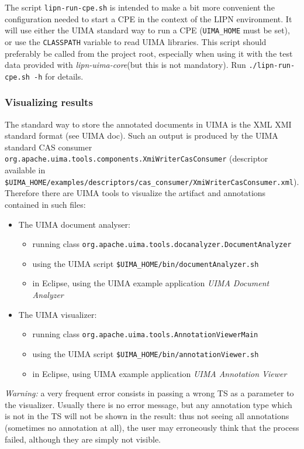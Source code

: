 \documentclass{article}
\newenvironment{xitemize}{
\begin{itemize}
  \setlength{\itemsep}{.3\baselineskip}
  \setlength{\topsep}{0pt}
  \setlength{\parskip}{0pt}
  \setlength{\parsep}{0pt}
}{\end{itemize}}
\newcommand{\uimaModule}{{\em lipn-uima-core}\xspace}
\begin{document}
The script {\tt lipn-run-cpe.sh} is intended to make a bit more convenient the configuration needed to start a CPE in the context of the LIPN environment. It will use either the UIMA standard way to run a CPE ({\tt UIMA\_HOME} must be set), or use the {\tt CLASSPATH} variable to read UIMA libraries. This script should preferably be called from the project root, especially when using it with the test data provided with \uimaModule (but this is not mandatory). Run {\tt ./lipn-run-cpe.sh -h} for details.


\subsubsection{Visualizing results}

The standard way to store the annotated documents in UIMA is the XML XMI standard format (see UIMA doc). Such an output is produced by the UIMA standard CAS consumer {\tt org.apache.uima.tools.components.XmiWriterCasConsumer} (descriptor available in {\tt \$UIMA\_HOME/examples/descriptors/cas\_consumer/XmiWriterCasConsumer.xml}). Therefore there are UIMA tools to visualize the artifact and annotations contained in such files:

\begin{xitemize}
\item The UIMA document analyser:
\begin{xitemize}
\item running class {\tt org.apache.uima.tools.docanalyzer.DocumentAnalyzer}
\item using the UIMA script {\tt \$UIMA\_HOME/bin/documentAnalyzer.sh}
\item in Eclipse, using the UIMA example application {\em UIMA Document Analyzer}
\end{xitemize}
\item The UIMA visualizer:
\begin{xitemize}
\item running class {\tt org.apache.uima.tools.AnnotationViewerMain}
\item using the UIMA script {\tt \$UIMA\_HOME/bin/annotationViewer.sh}
\item in Eclipse, using UIMA example application {\em UIMA Annotation Viewer}
\end{xitemize}
\end{xitemize}

{\em Warning:} a very frequent error consists in passing a wrong TS as a parameter to the visualizer. Usually there is no error message, but any annotation type which is not in the TS will not be shown in the result: thus not seeing all annotations (sometimes no annotation at all), the user may erroneously think that the process failed, although they are simply not visible.
\end{document}
